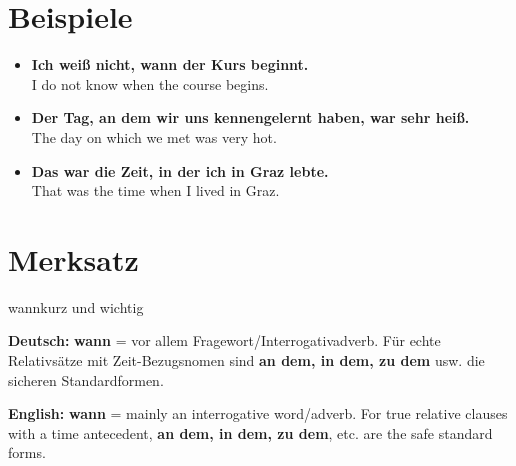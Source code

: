 \documentclass[a4paper,11pt]{article}
\newcommand{\GermanText}[1]{\textbf{Deutsch: }#1\par}
\newcommand{\EnglishText}[1]{{\small\color{SoftGray}\textbf{English: }#1\par}}
\newcommand{\ExampleItem}[2]{\item \textbf{#1}\\{\small\color{SoftGray}#2}}
\begin{document}
\section{Beispiele}

\begin{exbox}

\begin{itemize}

\ExampleItem{Ich weiß nicht, wann der Kurs beginnt.}{I do not know when the course begins.}

\ExampleItem{Der Tag, an dem wir uns kennengelernt haben, war sehr heiß.}{The day on which we met was very hot.}

\ExampleItem{Das war die Zeit, in der ich in Graz lebte.}{That was the time when I lived in Graz.}

\end{itemize}

\end{exbox}

\section{Merksatz}

\begin{grammarentry}{wann}{kurz und wichtig}

\GermanText{\textbf{wann} = vor allem Fragewort/Interrogativadverb. Für echte Relativsätze mit Zeit-Bezugsnomen sind \textbf{an dem, in dem, zu dem} usw. die sicheren Standardformen.}

\EnglishText{\textbf{wann} = mainly an interrogative word/adverb. For true relative clauses with a time antecedent, \textbf{an dem, in dem, zu dem}, etc. are the safe standard forms.}

\end{grammarentry}
\end{document}
